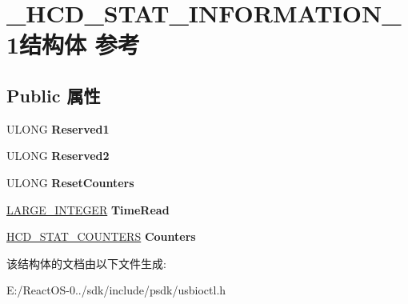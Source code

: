 \hypertarget{struct___h_c_d___s_t_a_t___i_n_f_o_r_m_a_t_i_o_n__1}{}\section{\+\_\+\+H\+C\+D\+\_\+\+S\+T\+A\+T\+\_\+\+I\+N\+F\+O\+R\+M\+A\+T\+I\+O\+N\+\_\+1结构体 参考}
\label{struct___h_c_d___s_t_a_t___i_n_f_o_r_m_a_t_i_o_n__1}
\subsection*{Public 属性}
\begin{DoxyCompactItemize}
\item 
\mbox{\label{struct___h_c_d___s_t_a_t___i_n_f_o_r_m_a_t_i_o_n__1_a5e3796050982592bd0b76a931ebd8d1a}} 
U\+L\+O\+NG {\bfseries Reserved1}
\item 
\mbox{\label{struct___h_c_d___s_t_a_t___i_n_f_o_r_m_a_t_i_o_n__1_a5b72fb6b10cd2d0f2358200b75bfabcb}} 
U\+L\+O\+NG {\bfseries Reserved2}
\item 
\mbox{\label{struct___h_c_d___s_t_a_t___i_n_f_o_r_m_a_t_i_o_n__1_a7123cc6797e3def30fd09f3da4c1693a}} 
U\+L\+O\+NG {\bfseries Reset\+Counters}
\item 
\mbox{\label{struct___h_c_d___s_t_a_t___i_n_f_o_r_m_a_t_i_o_n__1_ad6790ce72013a9cdf2b17c0b86f67269}} 
\hyperlink{union___l_a_r_g_e___i_n_t_e_g_e_r}{L\+A\+R\+G\+E\+\_\+\+I\+N\+T\+E\+G\+ER} {\bfseries Time\+Read}
\item 
\mbox{\label{struct___h_c_d___s_t_a_t___i_n_f_o_r_m_a_t_i_o_n__1_a4e13053ed2d19b7b53106f96b19cdac9}} 
\hyperlink{struct___h_c_d___s_t_a_t___c_o_u_n_t_e_r_s}{H\+C\+D\+\_\+\+S\+T\+A\+T\+\_\+\+C\+O\+U\+N\+T\+E\+RS} {\bfseries Counters}
\end{DoxyCompactItemize}


该结构体的文档由以下文件生成\+:\begin{DoxyCompactItemize}
\item 
E\+:/\+React\+O\+S-\/0../sdk/include/psdk/usbioctl.\+h\end{DoxyCompactItemize}
